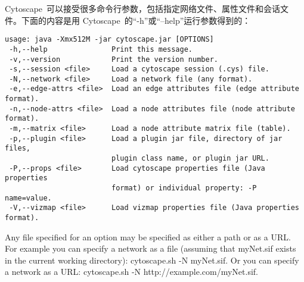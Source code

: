 Cytoscape~可以接受很多命令行参数，包括指定网络文件、属性文件和会话文件。下面的内容是用
Cytoscape~的“-h”或“--help”运行参数得到的：
\begin{verbatim}
usage: java -Xmx512M -jar cytoscape.jar [OPTIONS]
 -h,--help               Print this message.
 -v,--version            Print the version number.
 -s,--session <file>     Load a cytoscape session (.cys) file.
 -N,--network <file>     Load a network file (any format).
 -e,--edge-attrs <file>  Load an edge attributes file (edge attribute format).
 -n,--node-attrs <file>  Load a node attributes file (node attribute format).
 -m,--matrix <file>      Load a node attribute matrix file (table).
 -p,--plugin <file>      Load a plugin jar file, directory of jar files,
                         plugin class name, or plugin jar URL.
 -P,--props <file>       Load cytoscape properties file (Java properties
                         format) or individual property: -P name=value.
 -V,--vizmap <file>      Load vizmap properties file (Java properties format).
\end{verbatim}
Any file specified for an option may be specified as either a path or as a URL.
For example you can specify a network as a file (assuming that myNet.sif exists
in the current working directory): cytoscape.sh -N myNet.sif. Or you can specify
a network as a URL: cytoscape.sh -N http://example.com/myNet.sif.

